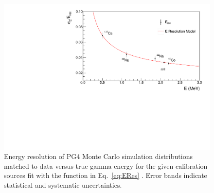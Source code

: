 \begin{figure}[h]
	\centering
	\includegraphics[width=0.7\linewidth]{tex/5-analysis-images/GammaRes}
	\caption{Energy resolution of PG4 Monte Carlo simulation distributions matched to data versus true gamma energy for the given calibration sources fit with the function in Eq.~\ref{eq:ERes} \cite{XZhang:2815}. Error bands indicate statistical and systematic uncertainties.}
	\label{fig:gammares}
\end{figure}



